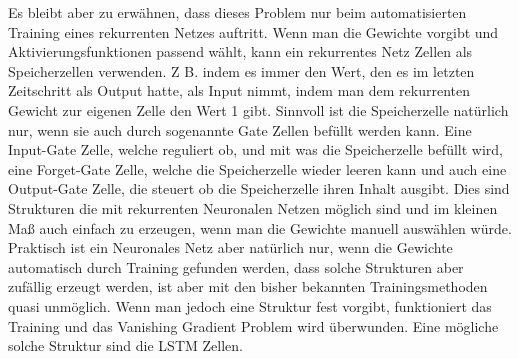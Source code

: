 Es bleibt aber zu erwähnen, dass dieses Problem nur beim automatisierten Training eines rekurrenten Netzes auftritt. Wenn man die Gewichte vorgibt und Aktivierungsfunktionen passend wählt, kann ein rekurrentes Netz Zellen als Speicherzellen verwenden. Z B. indem es immer den Wert, den es im letzten Zeitschritt als Output hatte, als Input nimmt, indem man dem rekurrenten Gewicht zur eigenen Zelle den Wert 1 gibt. Sinnvoll ist die Speicherzelle natürlich nur, wenn sie auch durch sogenannte Gate Zellen befüllt werden kann. Eine Input-Gate Zelle, welche reguliert ob, und mit was die Speicherzelle befüllt wird, eine Forget-Gate Zelle, welche die Speicherzelle wieder leeren kann und auch eine Output-Gate Zelle, die steuert ob die Speicherzelle ihren Inhalt ausgibt. Dies sind Strukturen die mit rekurrenten Neuronalen Netzen möglich sind und im kleinen Maß auch einfach zu erzeugen, wenn man die Gewichte manuell auswählen würde. Praktisch ist ein Neuronales Netz aber natürlich nur, wenn die Gewichte automatisch durch Training gefunden werden, dass solche Strukturen aber zufällig erzeugt werden, ist aber mit den bisher bekannten Trainingsmethoden quasi unmöglich. Wenn man jedoch eine Struktur fest vorgibt, funktioniert das Training und das Vanishing Gradient Problem wird überwunden. Eine mögliche solche Struktur sind die LSTM Zellen. 
